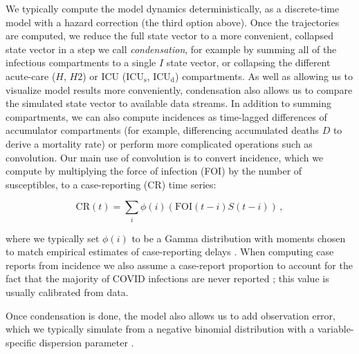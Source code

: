 \documentclass[12pt]{article}\usepackage[]{graphicx}\usepackage[]{color}
\begin{document}
We typically compute the model dynamics deterministically, as a discrete-time model with a hazard correction (the third option above).  Once the trajectories are computed, we reduce the full state vector to a more convenient, collapsed state vector in a step we call \emph{condensation}, for example by summing all of the infectious compartments to a single $I$ state vector, or collapsing the different acute-care ($H$, $H2$) or ICU ($\textrm{ICU}_\textrm{s}$, $\textrm{ICU}_\textrm{d}$) compartments.
As well as allowing us to visualize model results more conveniently, condensation also allows us to compare the simulated state vector to available data streams.
In addition to summing compartments, we can also compute incidences as time-lagged differences of accumulator compartments (for example, differencing accumulated deaths $D$ to derive a mortality rate) or perform more complicated operations such as convolution. 
Our main use of convolution is to convert incidence, which we compute by multiplying the force of infection (FOI) by the number of susceptibles, to a case-reporting (CR) time series: 
\begin{linenomath*}
\begin{equation}\label{eq:CR}
\textrm{CR}(t) = \sum_i \phi(i) (\textrm{FOI}(t-i) S(t-i))\,,
\end{equation}
\end{linenomath*}
where we typically set $\phi(i)$ to be a Gamma distribution with
moments chosen to match empirical estimates of case-reporting delays
.
When computing case reports from incidence we also assume a case-report proportion  to account for the fact that the majority of COVID infections are never reported \cite{Doug+2020}; this value is usually calibrated from data.

Once condensation is done, the model also allows us to add observation error, which we typically simulate from a negative binomial distribution with a variable-specific dispersion parameter \cite{linden2011using}.
\end{document}
